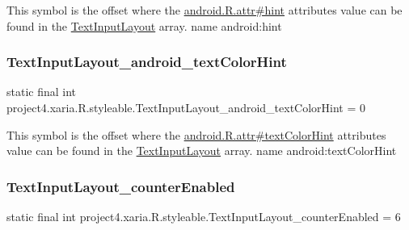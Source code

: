 This symbol is the offset where the \hyperlink{}{android.\+R.\+attr\#hint} attribute\textquotesingle{}s value can be found in the \hyperlink{classproject4_1_1xaria_1_1R_1_1styleable_a5a2e4611c17d75c805194b416b9fed74}{Text\+Input\+Layout} array.  name android\+:hint \mbox{\label{classproject4_1_1xaria_1_1R_1_1styleable_ad0454b679c861e8e4733869036a95b28}} 
\subsubsection{\texorpdfstring{Text\+Input\+Layout\+\_\+android\+\_\+text\+Color\+Hint}{TextInputLayout\_android\_textColorHint}}
{\footnotesize\ttfamily static final int project4.\+xaria.\+R.\+styleable.\+Text\+Input\+Layout\+\_\+android\+\_\+text\+Color\+Hint = 0\hspace{0.3cm}{\ttfamily [static]}}

This symbol is the offset where the \hyperlink{}{android.\+R.\+attr\#text\+Color\+Hint} attribute\textquotesingle{}s value can be found in the \hyperlink{classproject4_1_1xaria_1_1R_1_1styleable_a5a2e4611c17d75c805194b416b9fed74}{Text\+Input\+Layout} array.  name android\+:text\+Color\+Hint \mbox{\label{classproject4_1_1xaria_1_1R_1_1styleable_abe72b67bbd7e17ba750c31e1e301e1e2}} 
\subsubsection{\texorpdfstring{Text\+Input\+Layout\+\_\+counter\+Enabled}{TextInputLayout\_counterEnabled}}
{\footnotesize\ttfamily static final int project4.\+xaria.\+R.\+styleable.\+Text\+Input\+Layout\+\_\+counter\+Enabled = 6\hspace{0.3cm}{\ttfamily [static]}}

